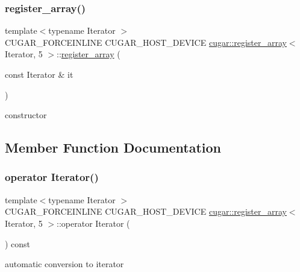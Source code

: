 \subsubsection{\texorpdfstring{register\+\_\+array()}{register\_array()}\hspace{0.1cm}{\footnotesize\ttfamily [2/2]}}
{\footnotesize\ttfamily template$<$typename Iterator $>$ \\
C\+U\+G\+A\+R\+\_\+\+F\+O\+R\+C\+E\+I\+N\+L\+I\+NE C\+U\+G\+A\+R\+\_\+\+H\+O\+S\+T\+\_\+\+D\+E\+V\+I\+CE \hyperlink{structcugar_1_1register__array}{cugar\+::register\+\_\+array}$<$ Iterator, 5 $>$\+::\hyperlink{structcugar_1_1register__array}{register\+\_\+array} (\begin{DoxyParamCaption}\item[{const Iterator \&}]{it }\end{DoxyParamCaption})\hspace{0.3cm}{\ttfamily [inline]}}

constructor 

\subsection{Member Function Documentation}
\mbox{\label{structcugar_1_1register__array_3_01_iterator_00_015_01_4_a923543aa3170e9e96205d3cd12e1f889}} 
\subsubsection{\texorpdfstring{operator Iterator()}{operator Iterator()}}
{\footnotesize\ttfamily template$<$typename Iterator $>$ \\
C\+U\+G\+A\+R\+\_\+\+F\+O\+R\+C\+E\+I\+N\+L\+I\+NE C\+U\+G\+A\+R\+\_\+\+H\+O\+S\+T\+\_\+\+D\+E\+V\+I\+CE \hyperlink{structcugar_1_1register__array}{cugar\+::register\+\_\+array}$<$ Iterator, 5 $>$\+::operator Iterator (\begin{DoxyParamCaption}{ }\end{DoxyParamCaption}) const\hspace{0.3cm}{\ttfamily [inline]}}

automatic conversion to iterator \mbox{\label{structcugar_1_1register__array_3_01_iterator_00_015_01_4_acc61dfdba6b95289c08165bbfe23a3f1}} 
